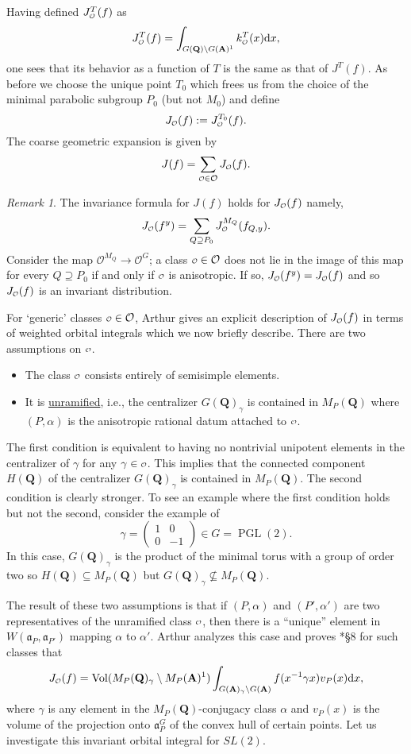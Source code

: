 \documentclass[11pt]{amsart}
\def\A{\mathbf A}
\def\Q{\mathbf Q}
\def\O{\mathcal O}
\def\o{\scalebox{0.8}{$\scriptstyle\mathcal{O}$}}
\def\aaa{\mathfrak a}
\def\d{\text d}
\def\bs{\setminus}
\def\vol{\operatorname{Vol}}
\theoremstyle{remark}
\newtheorem{remark}[theorem]{Remark}
\begin{document}
Having defined $J_{\o}^T(f)$ as
\[ J_{\o}^T(f) = \int_{G(\Q) \bs G(\A)^1} k_{\o}^T(x) \d x, \]
one sees that its behavior as a function of $T$ is the same as that of $J^T(f)$. As before we choose the unique point $T_0$ which frees us from the choice of the minimal parabolic subgroup $P_0$ (but not $M_0$) and define 
\[ J_{\o}(f) := J^{T_0}_{\o}(f). \]
The coarse geometric expansion is given by
\begin{equation} \label{coarse_geom}
	J(f) = \sum_{\o \in \O} J_{\o}(f). 
\end{equation}

\begin{remark}
	The invariance formula for $J(f)$ holds for $J_{\o}(f)$ namely,
	\[ J_{\o}(f^y) = \sum_{Q \supseteq P_0} J_{\o}^{M_Q}(f_{Q, y}). \]
	Consider the map $\O^{M_Q} \to \O^G$; a class $\o \in \O$ does not lie in the image of this map for every $Q \supseteq P_0$ if and only if $\o$ is anisotropic. If so, $J_{\o}(f^y) = J_{\o}(f)$ and so $J_{\o}(f)$ is an invariant distribution. 
\end{remark}

For `generic' classes $\o \in \O$, Arthur gives an explicit description of $J_{\o}(f)$ in terms of weighted orbital integrals which we now briefly describe. There are two assumptions on $\o$. 
\begin{itemize}
	\item The class $\o$ consists entirely of semisimple elements. 
	\item It is \underline{unramified}, i.e., the centralizer $G(\Q)_\gamma$ is contained in $M_P(\Q)$ where $(P, \alpha)$ is the anisotropic rational datum attached to $\o$. 
\end{itemize}
The first condition is equivalent to having no nontrivial unipotent elements in the centralizer of $\gamma$ for any $\gamma \in \o$. This implies that the connected component $H(\Q)$ of the centralizer $G(\Q)_\gamma$ is contained in $M_P(\Q)$. The second condition is clearly stronger. To see an example where the first condition holds but not the second, consider the example of 
\[ \gamma = \begin{pmatrix} 1 & 0 \\ 0 & -1 \end{pmatrix} \in G = \operatorname{PGL}(2). \]
In this case, $G(\Q)_\gamma$ is the product of the minimal torus with a group of order two so $H(\Q) \subseteq M_P(\Q)$ but $G(\Q)_\gamma \not\subseteq M_P(\Q)$. 

The result of these two assumptions is that if $(P, \alpha)$ and $(P', \alpha')$ are two representatives of the unramified class $\o$, then there is a ``unique'' element in $W(\aaa_P, \aaa_{P'})$ mapping $\alpha$ to $\alpha'$. Arthur analyzes this case and proves \cite{duke}*{\S 8} for such classes that
\begin{equation} \label{jo_anis}
	J_{\o}(f) = \vol(M_P(\Q)_\gamma \bs M_P(\A)^1) \int_{G(\A)_\gamma \bs G(\A)} f(x^{-1} \gamma x) v_P(x) \d x, 
\end{equation}
where $\gamma$ is any element in the $M_P(\Q)$-conjugacy class $\alpha$ and $v_P(x)$ is the volume of the projection onto $\aaa_P^G$ of the convex hull of certain points. Let us investigate this invariant orbital integral for $SL(2)$. 
\end{document}
